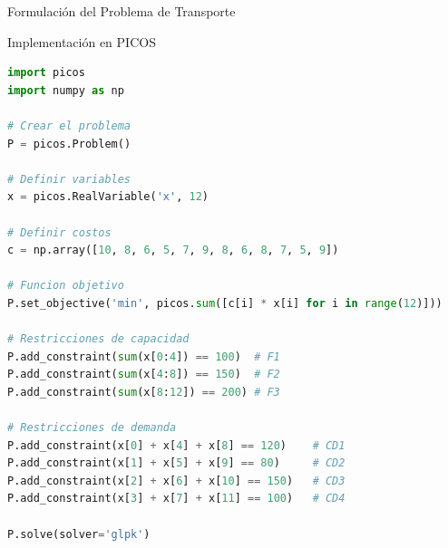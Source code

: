 \documentclass{beamer}
\begin{document}
\begin{frame}{Formulación del Problema de Transporte}
    
    \vspace{1em}
    
\end{frame}

\begin{frame}[fragile]{Implementación en PICOS}
    \begin{lstlisting}[language=Python]
import picos
import numpy as np

# Crear el problema
P = picos.Problem()

# Definir variables
x = picos.RealVariable('x', 12)

# Definir costos
c = np.array([10, 8, 6, 5, 7, 9, 8, 6, 8, 7, 5, 9])

# Funcion objetivo
P.set_objective('min', picos.sum([c[i] * x[i] for i in range(12)]))

# Restricciones de capacidad
P.add_constraint(sum(x[0:4]) == 100)  # F1
P.add_constraint(sum(x[4:8]) == 150)  # F2
P.add_constraint(sum(x[8:12]) == 200) # F3

# Restricciones de demanda
P.add_constraint(x[0] + x[4] + x[8] == 120)    # CD1
P.add_constraint(x[1] + x[5] + x[9] == 80)     # CD2
P.add_constraint(x[2] + x[6] + x[10] == 150)   # CD3
P.add_constraint(x[3] + x[7] + x[11] == 100)   # CD4

P.solve(solver='glpk')
    \end{lstlisting}
\end{frame}
\end{document}
